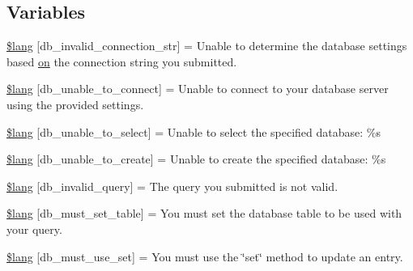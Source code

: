 \subsection*{Variables}
\begin{DoxyCompactItemize}
\item 
\hyperlink{_admin_2system_2language_2english_2db__lang_8php_a0c2ed2613101d37cbaba14042530c16d}{\$lang} \mbox{[}\textquotesingle{}db\+\_\+invalid\+\_\+connection\+\_\+str\textquotesingle{}\mbox{]} = \textquotesingle{}Unable to determine the database settings based \hyperlink{how_to_play_8js_af1f111425a03a603c02a2abf44ad8c43}{on} the connection string you submitted.\textquotesingle{}
\item 
\hyperlink{_admin_2system_2language_2english_2db__lang_8php_aa5935b86c957eb15ac7d41cf84143d66}{\$lang} \mbox{[}\textquotesingle{}db\+\_\+unable\+\_\+to\+\_\+connect\textquotesingle{}\mbox{]} = \textquotesingle{}Unable to connect to your database server using the provided settings.\textquotesingle{}
\item 
\hyperlink{_admin_2system_2language_2english_2db__lang_8php_a3c93974df838c0e036690874108715ea}{\$lang} \mbox{[}\textquotesingle{}db\+\_\+unable\+\_\+to\+\_\+select\textquotesingle{}\mbox{]} = \textquotesingle{}Unable to select the specified database\+: \%s\textquotesingle{}
\item 
\hyperlink{_admin_2system_2language_2english_2db__lang_8php_a4266e3b235feb16d9cf2e88afd1fedac}{\$lang} \mbox{[}\textquotesingle{}db\+\_\+unable\+\_\+to\+\_\+create\textquotesingle{}\mbox{]} = \textquotesingle{}Unable to create the specified database\+: \%s\textquotesingle{}
\item 
\hyperlink{_admin_2system_2language_2english_2db__lang_8php_a2cbf4ee929f45a29a0dcf21280bad485}{\$lang} \mbox{[}\textquotesingle{}db\+\_\+invalid\+\_\+query\textquotesingle{}\mbox{]} = \textquotesingle{}The query you submitted is not valid.\textquotesingle{}
\item 
\hyperlink{_admin_2system_2language_2english_2db__lang_8php_a0f5d469f071f2b5327b44761f4a06396}{\$lang} \mbox{[}\textquotesingle{}db\+\_\+must\+\_\+set\+\_\+table\textquotesingle{}\mbox{]} = \textquotesingle{}You must set the database table to be used with your query.\textquotesingle{}
\item 
\hyperlink{_admin_2system_2language_2english_2db__lang_8php_a55e22fb14cedc8ee7f70980bf7f37308}{\$lang} \mbox{[}\textquotesingle{}db\+\_\+must\+\_\+use\+\_\+set\textquotesingle{}\mbox{]} = \textquotesingle{}You must use the \char`\"{}set\char`\"{} method to update an entry.\textquotesingle{}

\end{DoxyCompactItemize}
